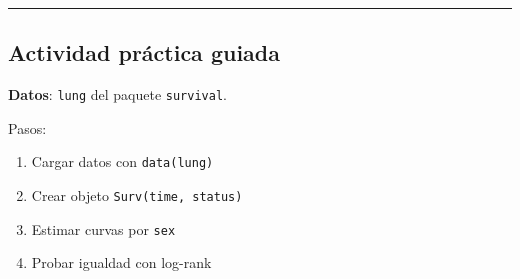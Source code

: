 \documentclass[
]{article}
\providecommand{\tightlist}{%
  \setlength{\itemsep}{0pt}\setlength{\parskip}{0pt}}
\begin{document}
\begin{center}\rule{0.5\linewidth}{0.5pt}\end{center}

\subsection{Actividad práctica
guiada}\label{actividad-pruxe1ctica-guiada}

\textbf{Datos}: \texttt{lung} del paquete \texttt{survival}.

Pasos:

\begin{enumerate}
\def\labelenumi{\arabic{enumi}.}
\tightlist
\item
  Cargar datos con \texttt{data(lung)}
\item
  Crear objeto \texttt{Surv(time,\ status)}
\item
  Estimar curvas por \texttt{sex}
\item
  Probar igualdad con log-rank
\end{enumerate}
\end{document}
